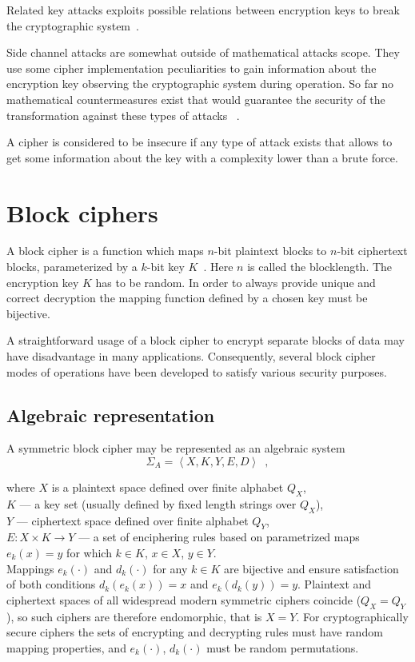 Related key attacks exploits possible relations between encryption keys to
break the cryptographic system~\cite{StampLow:AppliedCryptanalysis}.

Side channel attacks are somewhat outside of mathematical attacks scope. They
use some cipher implementation peculiarities to gain information about the
encryption key observing the cryptographic system during operation. So far no
mathematical countermeasures exist that would guarantee the security of the
transformation against these types of attacks ~\cite{Quisquater:sidechannel}.

A cipher is considered to be insecure if any type of attack exists that allows
to get some information about the key with a complexity lower than a brute
force.

\section{Block ciphers}

A block cipher is a function which maps $n$-bit plaintext blocks to $n$-bit
ciphertext blocks, parameterized by a $k$-bit key
$K$~\cite{menezes:applied_cryptography}. Here $n$ is called the blocklength.
The encryption key $K$ has to be random. In order to always provide unique and
correct decryption the mapping function defined by a chosen key must be
bijective.

A straightforward usage of a block cipher to encrypt separate blocks of data may have
disadvantage in many applications. Consequently, several block cipher modes of
operations have been developed to satisfy various security purposes.

\subsection{Algebraic representation}
\label{sec:block-algebraic}

A symmetric block cipher may be represented as an algebraic
system~\cite{babash:cryptography}
\begin{equation}
\label{eqn:block-algebraic}
\Sigma_{A} = \left< X, K, Y, E, D \right> \enspace,
\end{equation}

    where $X$ is a plaintext space defined over finite alphabet $Q_X$, \\
$K$ --- a key set (usually defined by fixed length strings over $Q_X$), \\
$Y$ --- ciphertext space defined over finite alphabet $Q_Y$, \\
$E: X \times K \rightarrow Y$ --- a set of enciphering rules based on
parametrized maps $e_k(x) = y$ for which $k \in K$, $x \in X$, $y \in Y$. \\
Mappings $e_k(\cdot)$ and $d_k(\cdot)$ for any $k \in K$  are bijective and
ensure satisfaction of both conditions $d_k(e_k(x)) = x$ and $e_k(d_k(y)) = y$.
Plaintext and ciphertext spaces of all widespread modern symmetric ciphers
coincide ($Q_X = Q_Y$), so such ciphers are therefore endomorphic, that is
\mbox{$X = Y$}.
For cryptographically secure ciphers the sets of encrypting and decrypting
rules must have random mapping properties, and $e_k(\cdot)$, $d_k(\cdot)$ must
be random permutations.


